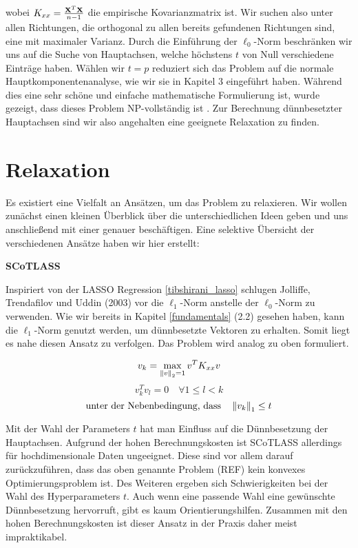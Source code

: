 wobei $K_{xx} = \frac{\mathbf{X}^T \mathbf{X}}{n-1}$ die empirische Kovarianzmatrix ist. Wir suchen also unter allen Richtungen, die orthogonal zu allen bereits gefundenen Richtungen sind, eine mit maximaler Varianz. Durch die Einführung der $\ell_0$-Norm beschränken wir uns auf die Suche von Hauptachsen, welche höchstens $t$ von Null verschiedene Einträge haben. Wählen wir $t = p$ reduziert sich das Problem auf die normale Hauptkomponentenanalyse, wie wir sie in Kapitel 3 eingeführt haben. Während dies eine sehr schöne und einfache mathematische Formulierung ist, wurde gezeigt, dass dieses Problem NP-vollständig ist \cite{foucart}. Zur Berechnung dünnbesetzter Hauptachsen sind wir also angehalten eine geeignete Relaxation zu finden.

\section{Relaxation}
\label{relaxation}

Es existiert eine Vielfalt an Ansätzen, um das Problem zu relaxieren. Wir wollen zunächst einen kleinen Überblick über die unterschiedlichen Ideen geben und uns anschließend mit einer genauer beschäftigen. Eine selektive Übersicht der verschiedenen Ansätze haben wir hier erstellt:

\textbf{SCoTLASS}

Inspiriert von der LASSO Regression \ref{tibshirani_lasso} schlugen Jolliffe, Trendafilov und Uddin (2003) \cite{scotlass} vor die $\ell_1$-Norm anstelle der $\ell_0$-Norm zu verwenden. Wie wir bereits in Kapitel \ref{fundamentals} (2.2) gesehen haben, kann die $\ell_1$-Norm genutzt werden, um dünnbesetzte Vektoren zu erhalten. Somit liegt es nahe diesen Ansatz zu verfolgen. Das Problem wird analog zu oben formuliert.

$$v_{k} = \max_{\left\lVert v \right\rVert_2 = 1} v^{T}K_{xx} v$$
$$v_{k}^Tv_{l} = 0 \quad \forall 1 \leq l < k$$
$${\text{unter der Nebenbedingung, dass}}\quad \left\lVert v_{k} \right\rVert_1 \leq t$$

Mit der Wahl der Parameters $t$ hat man Einfluss auf die Dünnbesetzung der Hauptachsen. Aufgrund der hohen Berechnungskosten ist SCoTLASS allerdings für hochdimensionale Daten ungeeignet. Diese sind vor allem darauf zurückzuführen, dass das oben genannte Problem (REF) kein konvexes Optimierungsproblem ist. Des Weiteren ergeben sich Schwierigkeiten bei der Wahl des Hyperparameters $t$. Auch wenn eine passende Wahl eine gewünschte Dünnbesetzung hervorruft, gibt es kaum Orientierungshilfen. Zusammen mit den hohen Berechnungskosten ist dieser Ansatz in der Praxis daher meist impraktikabel.

